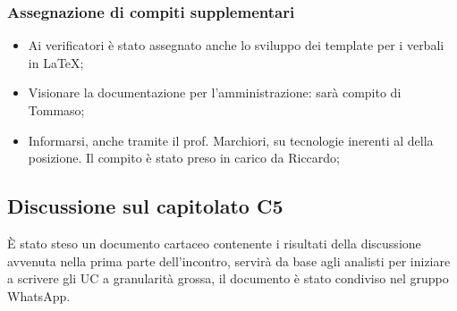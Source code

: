 \subsubsection{Assegnazione di compiti supplementari}
\begin{itemize}
\item Ai verificatori è stato assegnato anche lo sviluppo dei template per i verbali in \LaTeX;
\item Visionare la documentazione per l'amministrazione: sarà compito di Tommaso;
\item Informarsi, anche tramite il prof. Marchiori, su tecnologie inerenti al  della posizione. Il compito è stato preso in carico da Riccardo;
\end{itemize}
\subsection{Discussione sul capitolato C5}
È stato steso un documento cartaceo contenente i risultati della discussione avvenuta nella prima parte dell'incontro, servirà da base agli analisti per iniziare a scrivere gli UC a granularità grossa, il documento è stato condiviso nel gruppo WhatsApp.
\clearpage